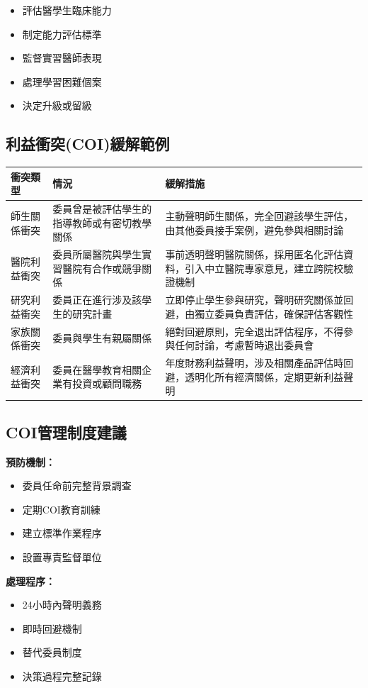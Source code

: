 \documentclass[12pt,a4paper]{article}
\begin{document}
\begin{itemize}[nosep]
    \item 評估醫學生臨床能力
    \item 制定能力評估標準
    \item 監督實習醫師表現
    \item 處理學習困難個案
    \item 決定升級或留級
\end{itemize}

\subsection{利益衝突(COI)緩解範例}

\begin{longtable}{p{3.5cm}p{5cm}p{5.5cm}}
\toprule
\textbf{衝突類型} & \textbf{情況} & \textbf{緩解措施} \\
\midrule
\endhead
師生關係衝突 & 委員曾是被評估學生的指導教師或有密切教學關係 & 主動聲明師生關係，完全回避該學生評估，由其他委員接手案例，避免參與相關討論 \\
醫院利益衝突 & 委員所屬醫院與學生實習醫院有合作或競爭關係 & 事前透明聲明醫院關係，採用匿名化評估資料，引入中立醫院專家意見，建立跨院校驗證機制 \\
研究利益衝突 & 委員正在進行涉及該學生的研究計畫 & 立即停止學生參與研究，聲明研究關係並回避，由獨立委員負責評估，確保評估客觀性 \\
家族關係衝突 & 委員與學生有親屬關係 & 絕對回避原則，完全退出評估程序，不得參與任何討論，考慮暫時退出委員會 \\
經濟利益衝突 & 委員在醫學教育相關企業有投資或顧問職務 & 年度財務利益聲明，涉及相關產品評估時回避，透明化所有經濟關係，定期更新利益聲明 \\
\bottomrule
\end{longtable}

\subsection{COI管理制度建議}

\textbf{預防機制：}
\begin{itemize}[nosep]
    \item 委員任命前完整背景調查
    \item 定期COI教育訓練
    \item 建立標準作業程序
    \item 設置專責監督單位
\end{itemize}

\textbf{處理程序：}
\begin{itemize}[nosep]
    \item 24小時內聲明義務
    \item 即時回避機制
    \item 替代委員制度
    \item 決策過程完整記錄
\end{itemize}
\end{document}
